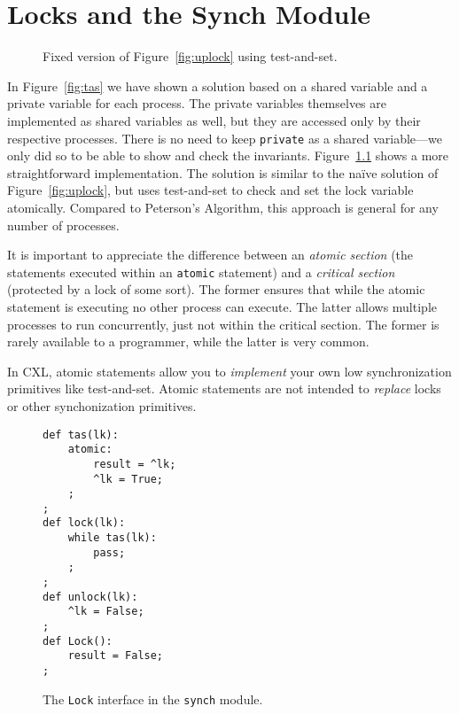 \documentclass{report}
\newenvironment{code}{
\tcolorbox
}{
\endtcolorbox
}
\begin{document}
\chapter{Locks and the Synch Module}

\begin{figure}
\begin{code}

\end{code}
\caption{Fixed version of Figure~\ref{fig:uplock} using test-and-set.}
\label{fig:tas2}
\end{figure}

In Figure~\ref{fig:tas} we have shown a solution based on a shared
variable and a private variable for each process.   The private
variables themselves are implemented as shared variables as well,
but they are accessed only by their respective processes.
There is no need to keep \texttt{private} as a shared
variable---we only did so to be able to show and check the invariants.
Figure~\ref{fig:tas2} shows a more straightforward implementation.
The solution is similar to the na\"{i}ve solution of Figure~\ref{fig:uplock},
but uses test-and-set to check and set the lock variable atomically.
Compared to Peterson's Algorithm, this approach is general for
any number of processes.

It is important to appreciate the difference between an
\emph{atomic section} (the statements executed within an
\texttt{atomic} statement) and a \emph{critical section}
(protected by a lock of some sort).
The former ensures that while the
atomic statement is executing no other process can execute.
The latter allows multiple processes to run concurrently,
just not within the critical section.
The former is rarely available to a programmer, while the latter
is very common.

In CXL, atomic statements allow you to \emph{implement} your own
low synchronization primitives like test-and-set.  Atomic statements
are not intended to \emph{replace} locks or other synchonization primitives.

\begin{figure}
\begin{code}
\begin{verbatim}
def tas(lk):
    atomic:
        result = ^lk;
        ^lk = True;
    ;
;
def lock(lk):
    while tas(lk):
        pass;
    ;
;
def unlock(lk):
    ^lk = False;
;
def Lock():
    result = False;
;
\end{verbatim}
\end{code}
\caption{The \texttt{Lock} interface in the \texttt{synch} module.}
\label{fig:locks}
\end{figure}
\end{document}
